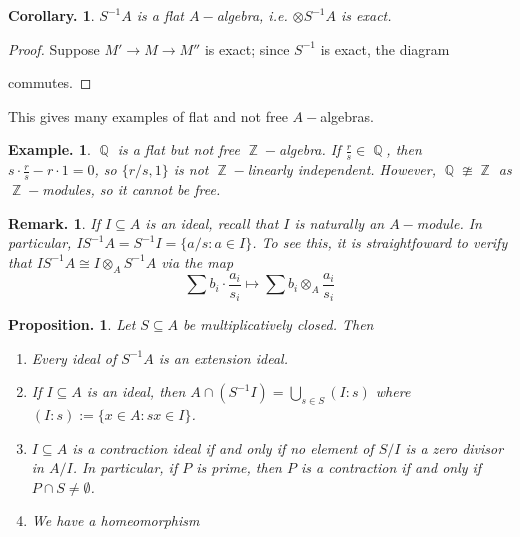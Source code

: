 \documentclass[11pt, a4paper]{memoir}
\DeclareMathOperator{\Q}{{\mathbb{Q}}}
\DeclareMathOperator{\Z}{{\mathbb{Z}}}
\theoremstyle{change}
\newtheorem{corollary}[theorem]{Corollary.}
\newtheorem{proposition}[theorem]{Proposition.}
\theoremstyle{plain}
\theoremstyle{nonumberplain}
\newtheorem{example}{Example.}
\newtheorem{remark}{Remark.}
\newtheorem{proof}{Proof}
\DeclareMathOperator{\id}{id}
\DeclareMathOperator{\Spec}{Spec}
\numberwithin{equation}{section}
\begin{document}
\begin{corollary}
    $S^{-1}A$ is a flat $A-$algebra, i.e. $\otimes S^{-1}A$ is exact.
\end{corollary}
\begin{proof}
    Suppose $M'\to M\to M''$ is exact; since $S^{-1}$ is exact, the diagram
    \begin{center}
    \end{center}
    commutes.
\end{proof}
This gives many examples of flat and not free $A-$algebras.
\begin{example}
    $\Q$ is a flat but not free $\Z-$algebra.
    If $\frac{r}{s}\in\Q$, then $s\cdot\frac{r}{s}-r\cdot 1=0$, so $\{r/s,1\}$ is not $\Z-$linearly independent.
    However, $\Q\ncong\Z$ as $\Z-$modules, so it cannot be free.
\end{example}
\begin{remark}
    If $I\subseteq A$ is an ideal, recall that $I$ is naturally an $A-$module.
    In particular, $IS^{-1}A=S^{-1}I=\{a/s:a\in I\}$.
    To see this, it is straightfoward to verify that $IS^{-1}A\cong I\otimes_A S^{-1}A$ via the map
    \begin{equation*}
        \sum b_i\cdot\frac{a_i}{s_i}\mapsto \sum b_i\otimes_A\frac{a_i}{s_i}
    \end{equation*}
\end{remark}
\begin{proposition}
    Let $S\subseteq A$ be multiplicatively closed.
    Then
    \begin{enumerate}[nl,r]
        \item Every ideal of $S^{-1}A$ is an extension ideal.
        \item If $I\subseteq A$ is an ideal, then $A\cap (S^{-1}I)=\bigcup_{s\in S}(I:s)$ where $(I:s):=\{x\in A:sx\in I\}$.
        \item $I\subseteq A$ is a contraction ideal if and only if no element of $S/I$ is a zero divisor in $A/I$.
            In particular, if $P$ is prime, then $P$ is a contraction if and only if $P\cap S\neq\emptyset$.
        \item We have a homeomorphism
            \begin{center}
            \end{center}
    \end{enumerate}
\end{proposition}
\end{document}

